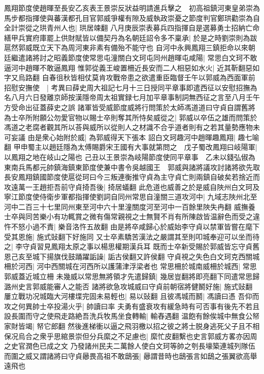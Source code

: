 鳳翔節度使趙暉至長安乙亥表王景崇反狀益明請進兵擊之　初高祖鎮河東皇弟崇為馬步都指揮使與蕃漢都孔目官郭威爭權有隙及威執政崇憂之節度判官鄭珙勸崇為自全計崇從之珙青州人也|{
	珙居竦翻}
八月庚辰崇表募兵四指揮自是選募勇士招納亡命繕甲兵實府庫罷上供財賦皆以備契丹為名朝廷詔令多不稟承|{
	於是之時劉崇則為跋扈然郭威既立天下為周河東非素有備殆不能守也}
自河中永興鳳翔三鎮拒命以來朝廷繼遣諸將討之昭義節度使常思屯潼關白文珂屯同州趙暉屯咸陽|{
	常思白文珂不敢逼河中趙暉不敢逼鳳翔}
惟郭從義王峻置柵近長安而二人相惡如水火|{
	近其靳翻惡如字又烏路翻}
自春徂秋皆相仗莫肯攻戰帝患之欲遣重臣臨督壬午以郭威為西面軍前招慰安撫使　|{
	考異曰薛史周大祖記七月十三日授同平章事即遣西征以安慰招撫為名八月六日發離京師按漢隱帝周太祖實録七月加平章事制詞無西征之言至八月壬午方受命出征蓋薛史之誤}
諸軍皆受威節度威將行問策於太師馮道道曰守貞自謂舊將為士卒所附願公勿愛官物以賜士卒則奪其所恃矣威從之|{
	郭威以卒伍之雄而問策於馮道之老腐者觀其所以荅與威所以從則人之材識不合乎道者則有之若其量勢應物未可妄議}
由是衆心始附於威|{
	為郭威得天下張本}
詔白文珂趣河中趙暉趣鳳翔|{
	趣七喻翻}
甲申蜀主以趙廷隱為太傅賜爵宋王國有大事就第問之　戊子蜀改鳳翔曰岐陽軍|{
	以鳳翔之地在岐山之陽也}
己丑以王景崇為岐陽節度使同平章事　乙未以錢弘俶為東南兵馬都元帥鎮海鎮東節度使兼中書令吳越國王　郭威與諸將議攻討諸將欲先取長安鳳翔鎮國節度使扈從珂曰今三叛連衡推守貞為主守貞亡則兩鎮自破矣若捨近而攻遠萬一王趙拒吾前守貞掎吾後|{
	掎居蟻翻}
此危道也威善之於是威自陜州白文珂及寧江節度使侍衛步軍都指揮使劉詞自同州常思自潼關三道攻河中|{
	九域志陜州北至河中二百三十七里同州東至河中六十里潼關度河至河中一百餘里陜失冉翻}
威撫養士卒與同苦樂小有功輒賞之微有傷常親視之士無賢不肖有所陳啟皆温辭色而受之違忤不怒小過不責|{
	樂音洛忤五故翻}
由是將卒咸歸心於威始李守貞以禁軍皆嘗在麾下受其恩施|{
	施式䜴翻下好施同}
又士卒素驕苦漢法之嚴謂其至則叩城奉迎可以坐而待之|{
	李守貞習見鳳翔太原之事以楊思權期漢兵耳}
既而士卒新受賜於郭威皆忘守貞舊恩己亥至城下揚旗伐鼓踊躍詬譟|{
	詬古侯翻又許侯翻}
守貞視之失色白文珂克西關城柵於河西|{
	河中西關城在河西所以護蒲津浮梁者也}
常思柵於城南威柵於城西|{
	常思郭威蓋近城立柵}
未幾威以常思無將領才先遣歸鎮|{
	幾居豈翻將即亮翻下同遣常思歸潞州史言郭威能審人之能否}
諸將欲急攻城威曰守貞前朝宿將健鬭好施|{
	施式䜴翻}
屢立戰功况城臨大河樓堞完固未易輕也|{
	易以䜴翻}
且彼馮城而鬭|{
	馮讀曰憑}
吾仰而攻之何異帥士卒投湯火乎|{
	帥讀曰率}
夫勇有盛衰攻有緩急時有可否事有後先不若且設長圍而守之使飛走路絶吾洗兵牧馬坐食轉輸|{
	輸舂遇翻}
温飽有餘俟城中無食公帑家財皆竭|{
	帑它郎翻}
然後進梯衝以逼之飛羽檄以招之彼之將士脱身逃死父子且不相保况烏合之衆乎思綰景崇但分兵縻之不足慮也|{
	縻忙皮翻繫也史言郭威方畧亦因周之史官潤色已成之文}
乃發諸州民夫二萬餘人使白文珂等帥之刳長壕築連城列隊伍而圍之威又謂諸將曰守貞曏畏高祖不敢鴟張|{
	曏謂昔時也鴟張言如鴟之張翼欲高舉遠飛也}
